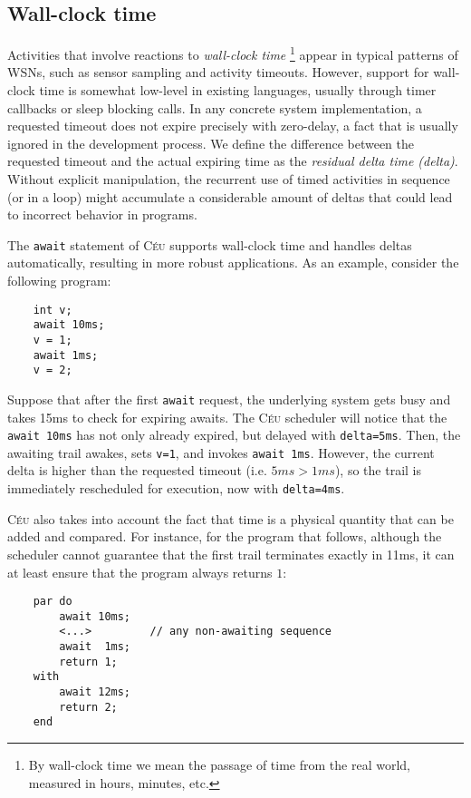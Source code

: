 \documentclass[10pt]{sensys-proc}
\newcommand{\CEU}{\textsc{C\'{e}u}\xspace}
\newcommand{\code}[1] {{\small{\texttt{#1}}}}
\begin{document}
\subsection{Wall-clock time}
\label{sec.ceu.wclocks}


Activities that involve reactions to \emph{wall-clock time}%
\footnote{
By wall-clock time we mean the passage of time from the real world, measured in 
hours, minutes, etc.
}
appear in typical patterns of WSNs, such as sensor sampling and activity 
timeouts.
However, support for wall-clock time is somewhat low-level in existing 
languages, usually through timer callbacks or sleep blocking calls.
%
In any concrete system implementation, a requested timeout does not expire 
precisely with zero-delay, a fact that is usually ignored in the development 
process.
We define the difference between the requested timeout and the actual expiring 
time as the \emph{residual delta time (delta)}.
Without explicit manipulation, the recurrent use of timed activities in 
sequence (or in a loop) might accumulate a considerable amount of deltas that 
could lead to incorrect behavior in programs.

The \code{await} statement of \CEU supports wall-clock time and handles deltas 
automatically, resulting in more robust applications.
As an example, consider the following program:

{\small
\begin{verbatim}
    int v;
    await 10ms;
    v = 1;
    await 1ms;
    v = 2;
\end{verbatim}
}

Suppose that after the first \code{await} request, the underlying system gets 
busy and takes 15ms to check for expiring awaits.
The \CEU scheduler will notice that the \code{await 10ms} has not only already 
expired, but delayed with \code{delta=5ms}.
Then, the awaiting trail awakes, sets \code{v=1}, and invokes \code{await 1ms}.
However, the current delta is higher than the requested timeout (i.e. $5ms > 
1ms$), so the trail is immediately rescheduled for execution, now with 
\code{delta=4ms}.

\CEU also takes into account the fact that time is a physical quantity that can 
be added and compared.
For instance, for the program that follows, although the scheduler cannot 
guarantee that the first trail terminates exactly in 11ms, it can at least 
ensure that the program always returns $1$:

{\small
\begin{verbatim}
    par do
        await 10ms;
        <...>         // any non-awaiting sequence
        await  1ms;
        return 1;
    with
        await 12ms;
        return 2;
    end
\end{verbatim}
}
\end{document}
